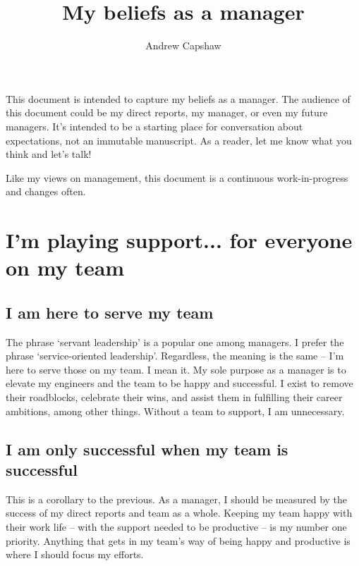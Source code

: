 \documentclass[11pt]{amsart}
\title{My beliefs as a manager}
\author{Andrew Capshaw}
\begin{document}
\thispagestyle{empty}



\maketitle

This document is intended to capture my beliefs as a manager. The audience of this document could be my direct reports, my manager, or even my future managers. It's intended to be a starting place for conversation about expectations, not an immutable manuscript. As a reader, let me know what you think and let's talk! 

Like my views on management, this document is a continuous work-in-progress and changes often.

\section{I'm playing support... for everyone on my team} %
\subsection{I am here to serve my team}
The phrase `servant leadership’ is a popular one among managers. I prefer the phrase `service-oriented leadership'. Regardless, the meaning is the same -- I'm here to serve those on my team. I mean it. My sole purpose as a manager is to elevate my engineers and the team to be happy and successful. I exist to remove their roadblocks, celebrate their wins, and assist them in fulfilling their career ambitions, among other things. Without a team to support, I am unnecessary.

\subsection{I am only successful when my team is successful}
This is a corollary to the previous. As a manager, I should be measured by the success of my direct reports and team as a whole. Keeping my team  happy with their work life -- with the support needed to be productive -- is my number one priority. Anything that gets in my team's way of being happy and productive is where I should focus my efforts.
\end{document}
